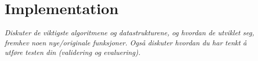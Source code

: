 
\chapter{Implementation} %

\label{Chapter5} %



\emph{Diskuter de viktigste algoritmene og datastrukturene, og hvordan de utviklet seg, fremhev noen nye/originale funksjoner. Også diskuter hvordan du har tenkt å utføre testen din (validering og evaluering).}
